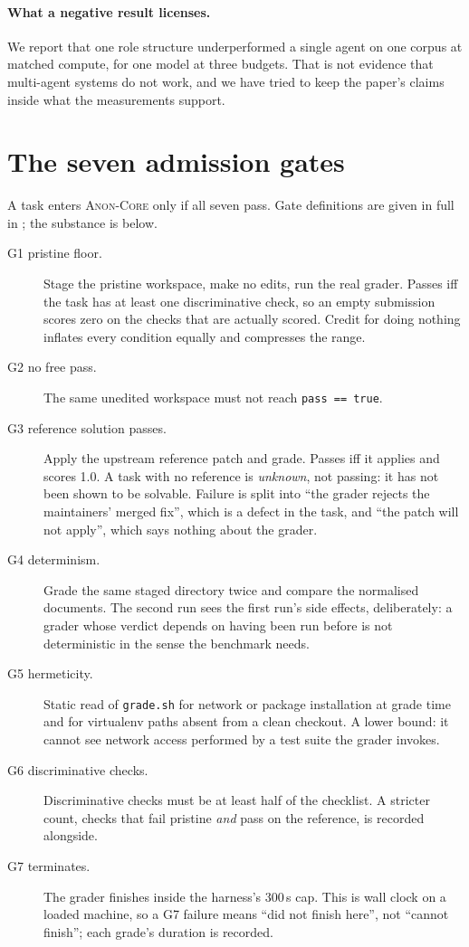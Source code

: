 \documentclass[11pt]{article}
\newcommand{\pth}[1]{\path{#1}}
\newcommand{\core}{\textsc{Anon-Core}}
\newcommand{\core}{\textsc{TeamBench-Core}}
\begin{document}
\paragraph{What a negative result licenses.} We report that one role structure
underperformed a single agent on one corpus at matched compute, for one model
at three budgets. That is not evidence that multi-agent systems do not work, and
we have tried to keep the paper's claims inside what the measurements support.

\section{The seven admission gates}
\label{app:gates}

A task enters \core{} only if all seven pass. Gate definitions are given in full
in \pth{scripts/task_admission_gate.py}; the substance is below.

\begin{description}
\item[G1 pristine floor.] Stage the pristine workspace, make no edits, run the
      real grader. Passes iff the task has at least one discriminative check, so
      an empty submission scores zero on the checks that are actually scored.
      Credit for doing nothing inflates every condition equally and compresses
      the range.
\item[G2 no free pass.] The same unedited workspace must not reach
      \texttt{pass == true}.
\item[G3 reference solution passes.] Apply the upstream reference patch and
      grade. Passes iff it applies and scores 1.0. A task with no reference is
      \emph{unknown}, not passing: it has not been shown to be solvable. Failure
      is split into ``the grader rejects the maintainers' merged fix'', which is
      a defect in the task, and ``the patch will not apply'', which says nothing
      about the grader.
\item[G4 determinism.] Grade the same staged directory twice and compare the
      normalised documents. The second run sees the first run's side effects,
      deliberately: a grader whose verdict depends on having been run before is
      not deterministic in the sense the benchmark needs.
\item[G5 hermeticity.] Static read of \texttt{grade.sh} for network or package
      installation at grade time and for virtualenv paths absent from a clean
      checkout. A lower bound: it cannot see network access performed by a test
      suite the grader invokes.
\item[G6 discriminative checks.] Discriminative checks must be at least half of
      the checklist. A stricter count, checks that fail pristine \emph{and} pass
      on the reference, is recorded alongside.
\item[G7 terminates.] The grader finishes inside the harness's 300\,s cap. This
      is wall clock on a loaded machine, so a G7 failure means ``did not finish
      here'', not ``cannot finish''; each grade's duration is recorded.
\end{description}
\end{document}
